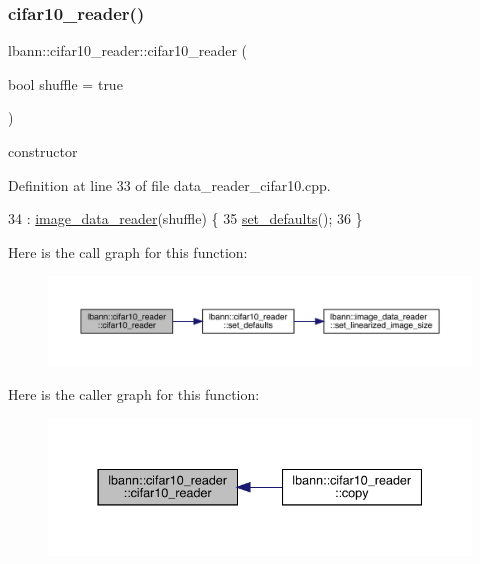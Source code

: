 \subsubsection{\texorpdfstring{cifar10\+\_\+reader()}{cifar10\_reader()}\hspace{0.1cm}{\footnotesize\ttfamily [1/2]}}
{\footnotesize\ttfamily lbann\+::cifar10\+\_\+reader\+::cifar10\+\_\+reader (\begin{DoxyParamCaption}\item[{bool}]{shuffle = {\ttfamily true} }\end{DoxyParamCaption})}



constructor 



Definition at line 33 of file data\+\_\+reader\+\_\+cifar10.\+cpp.


\begin{DoxyCode}
34   : \hyperlink{classlbann_1_1image__data__reader_a582185ab03c4643117fd93e0ba843882}{image\_data\_reader}(shuffle) \{
35   \hyperlink{classlbann_1_1cifar10__reader_a4c5389d0a6641716c96aa07e58fa4e88}{set\_defaults}();
36 \}
\end{DoxyCode}
Here is the call graph for this function\+:\nopagebreak
\begin{figure}[H]
\begin{center}
\leavevmode
\includegraphics[width=350pt]{classlbann_1_1cifar10__reader_a3e4fca66c9bd38798e56379d4a2cd6c0_cgraph}
\end{center}
\end{figure}
Here is the caller graph for this function\+:\nopagebreak
\begin{figure}[H]
\begin{center}
\leavevmode
\includegraphics[width=337pt]{classlbann_1_1cifar10__reader_a3e4fca66c9bd38798e56379d4a2cd6c0_icgraph}
\end{center}
\end{figure}
\mbox{\label{classlbann_1_1cifar10__reader_a1b4c310dc2bd5e78b197e334fc2b93d5}} 

